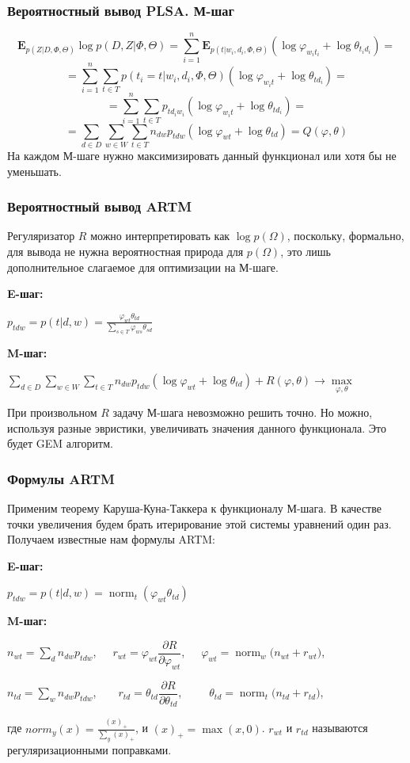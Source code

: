 \documentclass[utf8]{beamer}
\DeclareMathOperator{\norm}{norm}
\renewcommand{\phi}{\varphi}
\begin{document}
	 	\begin{frame}
		\frametitle{Вероятностный вывод PLSA. М-шаг}   
\[
\mathbf{E}_{p(Z|D,\Phi, \Theta)} \log p(D,Z|\Phi,\Theta) = 
\sum_{i=1}^{n} \mathbf{E}_{p(t|w_{i}, d_{i}, \Phi, \Theta)} (\log \phi_{w_{i} t_{i}} + \log \theta_{t_{i} d_{i}}) =
\]
\[
= \sum_{i=1}^{n} \sum_{t \in T} p(t_{i}=t|w_{i}, d_{i},\Phi,\Theta) (\log \phi_{w_{i} t} + \log \theta_{td_{i}}) =
\]
\[
= \sum_{i=1}^{n} \sum_{t \in T} p_{td_{i}w_{i}} (\log \phi_{w_{i} t} + \log \theta_{td_i}) =
\]
\[
=\sum_{d\in D}\sum_{w \in W} \sum_{t \in T} n_{dw} p_{tdw} (\log \phi_{wt} + \log \theta_{td}) = Q(\phi, \theta)
\]
На каждом М-шаге нужно максимизировать данный функционал или хотя бы не уменьшать.
	\end{frame}
	
	\begin{frame}
	\frametitle{Вероятностный вывод ARTM}
	Регуляризатор $R$ можно интерпретировать как $\log p(\Omega)$, поскольку, формально, для вывода не нужна вероятностная природа для $p(\Omega)$, это лишь дополнительное слагаемое для оптимизации на М-шаге.
	\medskip
	
	\textbf{E-шаг:}	
   		 
   		 \qquad $p_{tdw} = p(t|d, w) = \frac{\phi_{wt} \theta_{td}}{\sum\limits_{s\in T} \phi_{ws} \theta_{sd}}$ 		 
 		\medskip
 		
 	\textbf{M-шаг:}
 	
   		 
   		 \qquad $\sum\limits_{d\in D}\sum\limits_{w \in W} \sum\limits_{t \in T} n_{dw} p_{tdw} (\log \phi_{wt} + \log \theta_{td})  + R(\phi,\theta) \to \max\limits_{\phi,\theta}$
   	\medskip
   		 
	При произвольном $R$ задачу М-шага невозможно решить точно. Но можно, используя разные эвристики, увеличивать значения данного функционала. Это будет GEM алгоритм.
	\end{frame}
	
 	\begin{frame}
		\frametitle{Формулы ARTM}   
		Применим теорему Каруша-Куна-Таккера к функционалу М-шага. В качестве точки увеличения будем брать итерирование этой системы уравнений один раз. Получаем известные нам формулы ARTM:
		\medskip
		
   		\textbf{E-шаг:}	
   		 
   		 \qquad $p_{tdw} = p(t|d, w) = \norm_t(\varphi_{wt} \theta_{td})$ 		 
 		\medskip
 		
 		\textbf{M-шаг:}
    
 		\qquad $n_{wt} = \sum\limits_{d} n_{dw} p_{tdw}$,\ \ \ $r_{wt} =  \phi_{wt}\dfrac{\partial R}{\partial\phi_{wt}}$,\ \ \  $\phi_{wt}   = \norm_w\big(n_{wt} + r_{wt}\big)$,

 		\qquad $n_{td} = \sum\limits_{w} n_{dw} p_{tdw}$,\ \ \  \ $r_{td} =  \theta_{td}\dfrac{\partial R}{\partial\theta_{td}}$,\ \ \ \ \ $\theta_{td} = \norm_t  \big(n_{td} + r_{td}\big)$,
\medskip

	где $norm_y(x) = \frac{(x)_{+}}{\sum\limits_y (x)_{+}}$, и $(x)_{+} = \max(x, 0)$. $r_{wt}$ и $r_{td}$ называются регуляризационными поправками. 
	\end{frame}
\end{document}
